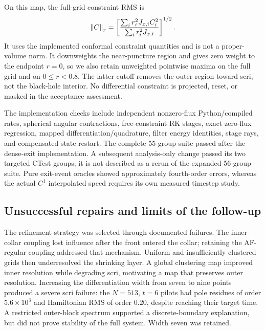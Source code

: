 On this map, the full-grid constraint RMS is
\begin{equation}
 \left\|C\right\|_r=\left[\frac{\sum_i r_i^2J_{x,i}C_i^2}
 {\sum_i r_i^2J_{x,i}}\right]^{1/2}.
\label{eq:telegraph-norm}
\end{equation}
It uses the implemented conformal constraint quantities and is not a proper-volume norm. It downweights the near-puncture region and gives zero weight to the endpoint $r=0$, so we also retain unweighted pointwise maxima on the full grid and on $0\leq r<0.8$. The latter cutoff removes the outer region toward scri, not the black-hole interior. No differential constraint is projected, reset, or masked in the acceptance assessment.

The implementation checks include independent nonzero-flux Python/compiled rates, spherical angular contractions, free-constraint RK stages, exact zero-flux regression, mapped differentiation/quadrature, filter energy identities, stage rays, and compensated-state restart. The complete 55-group suite passed after the dense-exit implementation. A subsequent analysis-only change passed its two targeted CTest groups; it is not described as a rerun of the expanded 56-group suite. Pure exit-event oracles showed approximately fourth-order errors, whereas the actual $C^1$ interpolated speed requires its own measured timestep study.




\subsection{Unsuccessful repairs and limits of the follow-up}
The refinement strategy was selected through documented failures. The inner-collar coupling lost influence after the front entered the collar; retaining the AF-regular coupling addressed that mechanism. Uniform and insufficiently clustered grids then underresolved the shrinking layer. A global clustering map improved inner resolution while degrading scri, motivating a map that preserves outer resolution. Increasing the differentiation width from seven to nine points produced a severe scri failure: the $N=513$, $t=6$ pilots had pole residues of order $5.6\times10^3$ and Hamiltonian RMS of order $0.20$, despite reaching their target time. A restricted outer-block spectrum supported a discrete-boundary explanation, but did not prove stability of the full system. Width seven was retained.

